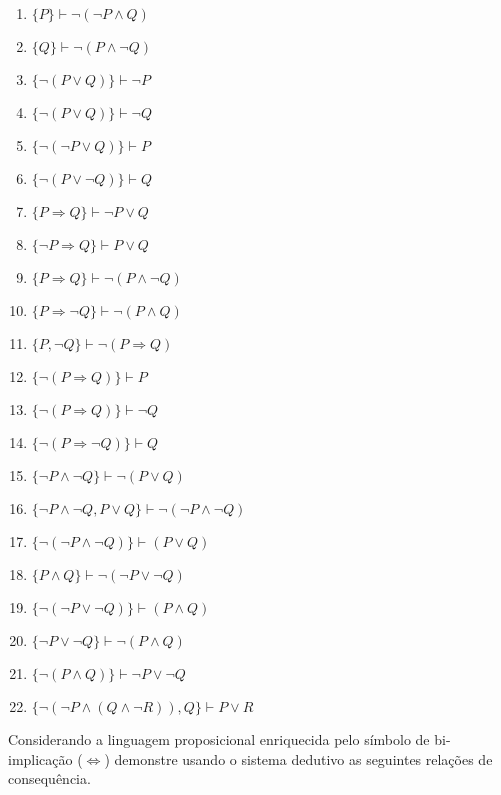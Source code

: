 \begin{enumerate}
    \item $\{P\} \vdash \neg (\neg P \land Q)$
    \item $\{Q\} \vdash \neg (P \land \neg Q)$
    \item $\{\neg (P \lor Q)\} \vdash \neg P$
    \item $\{\neg (P \lor Q)\} \vdash \neg Q$
    \item $\{\neg (\neg P \lor Q)\} \vdash P$
    \item $\{\neg (P \lor \neg Q)\} \vdash Q$
    \item $\{P \Rightarrow Q\} \vdash \neg P \lor Q$
    \item $\{\neg P \Rightarrow Q\} \vdash P \lor Q$
    \item $\{P \Rightarrow Q\} \vdash \neg (P \land \neg Q)$
    \item $\{P \Rightarrow \neg Q\} \vdash \neg (P \land Q)$
    \item $\{P, \neg Q\} \vdash \neg (P \Rightarrow Q)$
    \item $\{\neg (P \Rightarrow Q)\} \vdash P$
    \item $\{\neg (P \Rightarrow Q)\} \vdash \neg Q$
    \item $\{\neg (P \Rightarrow \neg Q)\} \vdash Q$
    \item $\{\neg P \land \neg Q\} \vdash \neg (P \lor Q)$
    \item $\{\neg P \land \neg Q, P \lor Q\} \vdash \neg (\neg P \land \neg Q)$
    \item $\{\neg (\neg P \land \neg Q)\} \vdash (P \lor Q)$
    \item $\{P \land Q\} \vdash \neg (\neg P \lor \neg Q)$
    \item $\{\neg (\neg P \lor \neg Q)\} \vdash (P \land Q)$
    \item $\{\neg P \lor \neg Q\} \vdash \neg (P \land Q)$
    \item $\{\neg (P \land Q)\} \vdash \neg P \lor \neg Q$
    \item $\{\neg (\neg P \land (Q \land \neg R)), Q\} \vdash P \lor R$
\end{enumerate}

\begin{exercise}\label{exerc:LPro2}
    Considerando a linguagem proposicional enriquecida pelo símbolo de bi-implicação ($\Leftrightarrow$) demonstre usando o sistema dedutivo as seguintes relações de consequência.
\end{exercise}

